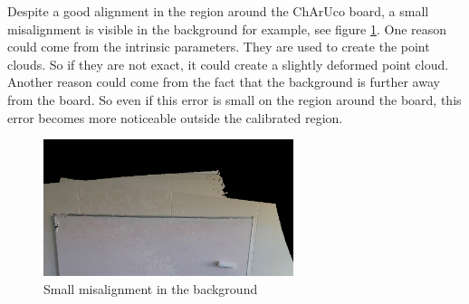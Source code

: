 Despite a good alignment in the region around the ChArUco board, a small misalignment is visible in the background for example, see figure \ref{figure:proposed_method_background}. One reason could come from the intrinsic parameters. They are used to create the point clouds. So if they are not exact, it could create a slightly deformed point cloud. Another reason  could come from the fact that the background is further away from the board. So even if this error is small on the region around the board, this error becomes more noticeable outside the calibrated region.

\begin{figure}[H]
    \centering
    \includegraphics[width=0.65\textwidth]{images/registration/proposed_method_background.png}
    \caption{Small misalignment in the background}
    \label{figure:proposed_method_background}
\end{figure}
